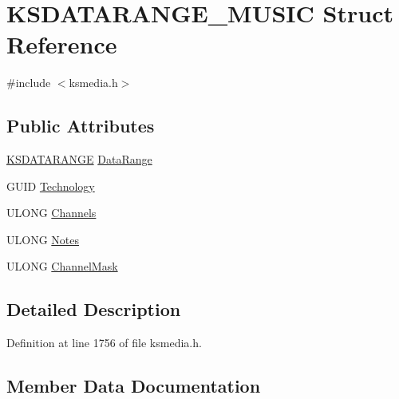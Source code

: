 \hypertarget{struct_k_s_d_a_t_a_r_a_n_g_e___m_u_s_i_c}{}\section{K\+S\+D\+A\+T\+A\+R\+A\+N\+G\+E\+\_\+\+M\+U\+S\+IC Struct Reference}
\label{struct_k_s_d_a_t_a_r_a_n_g_e___m_u_s_i_c}


{\ttfamily \#include $<$ksmedia.\+h$>$}

\subsection*{Public Attributes}
\begin{DoxyCompactItemize}
\item 
\hyperlink{ks_8h_a1ea8bc535eaf96036403dc325623b469}{K\+S\+D\+A\+T\+A\+R\+A\+N\+GE} \hyperlink{struct_k_s_d_a_t_a_r_a_n_g_e___m_u_s_i_c_a44b2581ae1b92e20d41af392cfc87722}{Data\+Range}
\item 
G\+U\+ID \hyperlink{struct_k_s_d_a_t_a_r_a_n_g_e___m_u_s_i_c_a74fe1845e7debcf132cfaf65adebaf62}{Technology}
\item 
U\+L\+O\+NG \hyperlink{struct_k_s_d_a_t_a_r_a_n_g_e___m_u_s_i_c_a007463c8c89599bdfd52e7dde7980ea9}{Channels}
\item 
U\+L\+O\+NG \hyperlink{struct_k_s_d_a_t_a_r_a_n_g_e___m_u_s_i_c_a6e8b0449adeee391c4487f92d9b80e9e}{Notes}
\item 
U\+L\+O\+NG \hyperlink{struct_k_s_d_a_t_a_r_a_n_g_e___m_u_s_i_c_a9a2001bfe540df78d935bd559221eecb}{Channel\+Mask}
\end{DoxyCompactItemize}


\subsection{Detailed Description}


Definition at line 1756 of file ksmedia.\+h.



\subsection{Member Data Documentation}
